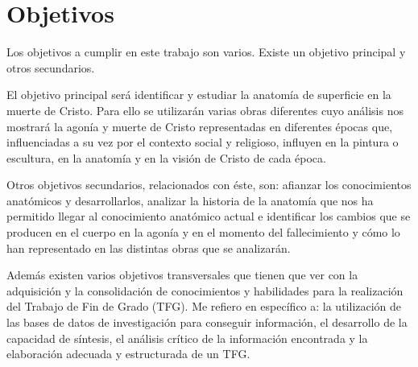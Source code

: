 \section{Objetivos}
Los objetivos a cumplir en este trabajo son varios. Existe un objetivo principal y otros secundarios.

El objetivo principal será identificar y estudiar la anatomía de superficie en la muerte de Cristo. Para ello se utilizarán varias obras diferentes cuyo análisis nos mostrará la agonía y muerte de Cristo representadas en diferentes épocas que, influenciadas a su vez por el contexto social y religioso, influyen en la pintura o escultura, en la anatomía y en la visión de Cristo de cada época.

Otros objetivos secundarios, relacionados con éste, son: afianzar los conocimientos anatómicos y desarrollarlos, analizar la historia de la anatomía que nos ha permitido llegar al conocimiento anatómico actual e identificar los cambios que se producen en el cuerpo en la agonía y en el momento del fallecimiento y cómo lo han representado en las distintas obras que se analizarán.

Además existen varios objetivos transversales que tienen que ver con la adquisición y la consolidación de conocimientos y habilidades para la realización del Trabajo de Fin de Grado (TFG). Me refiero en específico a: la utilización de las bases de datos de investigación para conseguir información, el desarrollo de la capacidad de síntesis, el análisis crítico de la información encontrada y la elaboración adecuada y estructurada de un TFG.